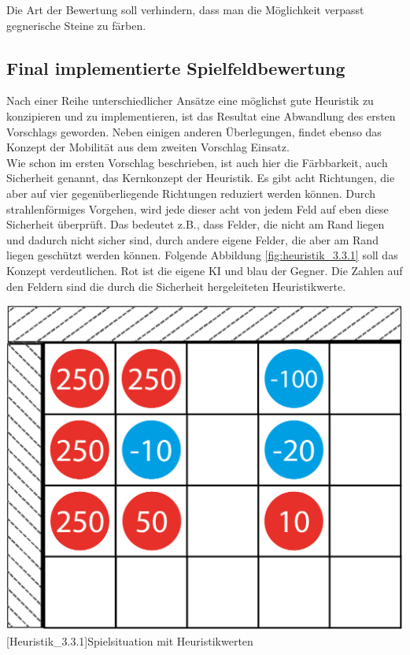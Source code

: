 \documentclass[12pt,a4paper,bibliography=totocnumbered,listof=totocnumbered]{scrartcl}
\begin{document}
    Die Art der Bewertung soll verhindern, dass man die Möglichkeit verpasst gegnerische Steine zu färben.
    
    \subsection{Final implementierte Spielfeldbewertung}
    \vspace{1em}

	Nach einer Reihe unterschiedlicher Ansätze eine möglichst gute Heuristik zu konzipieren und zu implementieren, ist das Resultat eine Abwandlung des ersten Vorschlags geworden. Neben einigen anderen Überlegungen, findet ebenso das Konzept der Mobilität aus dem zweiten Vorschlag Einsatz.\\
	Wie schon im ersten Vorschlag beschrieben, ist auch hier die \glqq Färbbarkeit\grqq, auch \glqq Sicherheit\grqq{}  genannt, das Kernkonzept der Heuristik. Es gibt acht Richtungen, die aber auf vier gegenüberliegende Richtungen reduziert werden können. Durch strahlenförmiges Vorgehen, wird jede dieser acht von jedem Feld auf eben diese \glqq Sicherheit\grqq{}  überprüft. Das bedeutet z.B., dass Felder, die nicht am Rand liegen und dadurch nicht sicher sind, durch andere eigene Felder, die aber am Rand liegen geschützt werden können. Folgende Abbildung  \ref{fig:heuristik_3.3.1} soll das Konzept verdeutlichen. Rot ist die eigene KI und blau der Gegner. Die Zahlen auf den Feldern sind die durch die \glqq Sicherheit\grqq{} hergeleiteten Heuristikwerte.
	
	\vspace{1em}
	\begin{minipage}{\linewidth}
		\centering
		\includegraphics[width=0.4\linewidth]{pics/Kapitel_3/Kapitel_3_pic8.png}
		[Heuristik_3.3.1]{Spielsituation mit Heuristikwerten\footnotemark }
		\label{fig:heuristik_3.3.1}
	\end{minipage}
	\vspace{1em}
\end{document}

